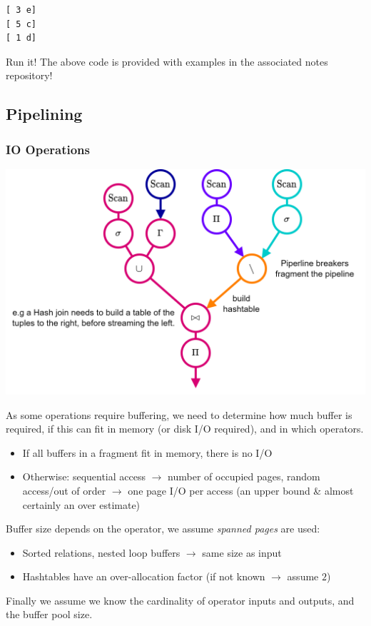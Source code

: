\begin{verbatim}
[ 3 e]
[ 5 c]
[ 1 d]
\end{verbatim}

\begin{sidenotebox}{Run it!}
    The above code is provided with examples in the associated notes repository!
\end{sidenotebox}

\subsection{Pipelining}
\subsubsection{IO Operations}
\begin{center}
  \includegraphics[width=.7\textwidth]{processing_models/images/pipeline_fragments.drawio.png}
\end{center}
As some operations require buffering, we need to determine how much buffer is required, if this can fit in memory (or disk I/O required), and in which operators.
\begin{itemize}
  \item If all buffers in a fragment fit in memory, there is no I/O
  \item Otherwise: sequential access $\to$ number of occupied pages, random access/out of order $\to$ one page I/O per access (an upper bound \& almost certainly an over estimate)
\end{itemize}
Buffer size depends on the operator, we assume \textit{spanned pages} are used:
\begin{itemize}
  \item Sorted relations, nested loop buffers $\to$ same size as input
  \item Hashtables have an over-allocation factor (if not known $\to$ assume $2$)
\end{itemize}
Finally we assume we know the cardinality of operator inputs and outputs, and the buffer pool size.

